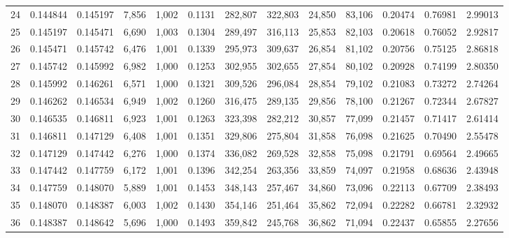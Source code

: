 \begin{tabular}{rrrrrrrrrrrrr}
24  &  0.144844 &  0.145197 &   7,856 &  1,002 &                                     0.1131 &  282,807 &  322,803 &   24,850 &   83,106 &  0.20474 &  0.76981 &  2.99013 \\
25  &  0.145197 &  0.145471 &   6,690 &  1,003 &                                     0.1304 &  289,497 &  316,113 &   25,853 &   82,103 &  0.20618 &  0.76052 &  2.92817 \\
26  &  0.145471 &  0.145742 &   6,476 &  1,001 &                                     0.1339 &  295,973 &  309,637 &   26,854 &   81,102 &  0.20756 &  0.75125 &  2.86818 \\
27  &  0.145742 &  0.145992 &   6,982 &  1,000 &                                     0.1253 &  302,955 &  302,655 &   27,854 &   80,102 &  0.20928 &  0.74199 &  2.80350 \\
28  &  0.145992 &  0.146261 &   6,571 &  1,000 &                                     0.1321 &  309,526 &  296,084 &   28,854 &   79,102 &  0.21083 &  0.73272 &  2.74264 \\
29  &  0.146262 &  0.146534 &   6,949 &  1,002 &                                     0.1260 &  316,475 &  289,135 &   29,856 &   78,100 &  0.21267 &  0.72344 &  2.67827 \\
30  &  0.146535 &  0.146811 &   6,923 &  1,001 &                                     0.1263 &  323,398 &  282,212 &   30,857 &   77,099 &  0.21457 &  0.71417 &  2.61414 \\
31  &  0.146811 &  0.147129 &   6,408 &  1,001 &                                     0.1351 &  329,806 &  275,804 &   31,858 &   76,098 &  0.21625 &  0.70490 &  2.55478 \\
32  &  0.147129 &  0.147442 &   6,276 &  1,000 &                                     0.1374 &  336,082 &  269,528 &   32,858 &   75,098 &  0.21791 &  0.69564 &  2.49665 \\
33  &  0.147442 &  0.147759 &   6,172 &  1,001 &                                     0.1396 &  342,254 &  263,356 &   33,859 &   74,097 &  0.21958 &  0.68636 &  2.43948 \\
34  &  0.147759 &  0.148070 &   5,889 &  1,001 &                                     0.1453 &  348,143 &  257,467 &   34,860 &   73,096 &  0.22113 &  0.67709 &  2.38493 \\
35  &  0.148070 &  0.148387 &   6,003 &  1,002 &                                     0.1430 &  354,146 &  251,464 &   35,862 &   72,094 &  0.22282 &  0.66781 &  2.32932 \\
36  &  0.148387 &  0.148642 &   5,696 &  1,000 &                                     0.1493 &  359,842 &  245,768 &   36,862 &   71,094 &  0.22437 &  0.65855 &  2.27656 \\

\end{tabular}
